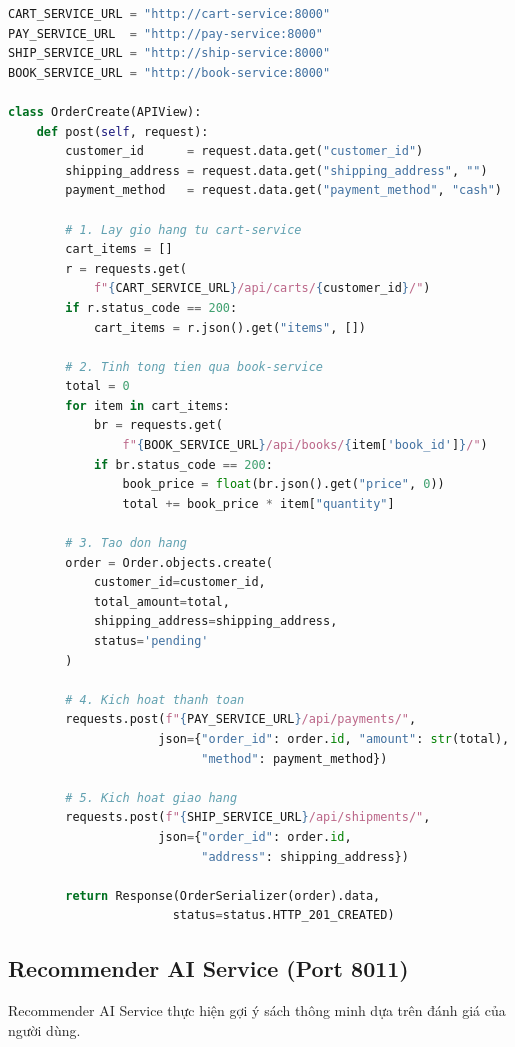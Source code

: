 \documentclass[12pt,a4paper]{article}
\begin{document}
\begin{lstlisting}[language=Python, caption={Luồng tạo đơn hàng -- order-service/app/views.py}]
CART_SERVICE_URL = "http://cart-service:8000"
PAY_SERVICE_URL  = "http://pay-service:8000"
SHIP_SERVICE_URL = "http://ship-service:8000"
BOOK_SERVICE_URL = "http://book-service:8000"

class OrderCreate(APIView):
    def post(self, request):
        customer_id      = request.data.get("customer_id")
        shipping_address = request.data.get("shipping_address", "")
        payment_method   = request.data.get("payment_method", "cash")

        # 1. Lay gio hang tu cart-service
        cart_items = []
        r = requests.get(
            f"{CART_SERVICE_URL}/api/carts/{customer_id}/")
        if r.status_code == 200:
            cart_items = r.json().get("items", [])

        # 2. Tinh tong tien qua book-service
        total = 0
        for item in cart_items:
            br = requests.get(
                f"{BOOK_SERVICE_URL}/api/books/{item['book_id']}/")
            if br.status_code == 200:
                book_price = float(br.json().get("price", 0))
                total += book_price * item["quantity"]

        # 3. Tao don hang
        order = Order.objects.create(
            customer_id=customer_id,
            total_amount=total,
            shipping_address=shipping_address,
            status='pending'
        )

        # 4. Kich hoat thanh toan
        requests.post(f"{PAY_SERVICE_URL}/api/payments/",
                     json={"order_id": order.id, "amount": str(total),
                           "method": payment_method})

        # 5. Kich hoat giao hang
        requests.post(f"{SHIP_SERVICE_URL}/api/shipments/",
                     json={"order_id": order.id,
                           "address": shipping_address})

        return Response(OrderSerializer(order).data,
                       status=status.HTTP_201_CREATED)
\end{lstlisting}

\subsection{Recommender AI Service (Port 8011)}

Recommender AI Service thực hiện gợi ý sách thông minh dựa trên đánh giá của người dùng.
\end{document}
